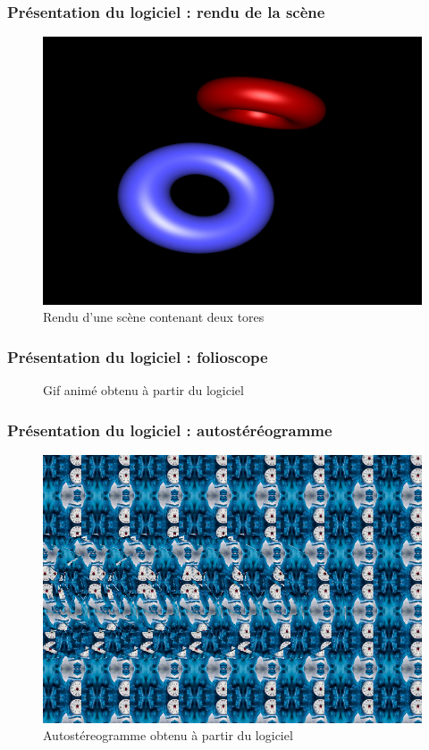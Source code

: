 \documentclass{beamer}
\begin{document}
%
\begin{frame}
\frametitle{Présentation du logiciel : rendu de la scène}
\begin{figure}
\centering
\includegraphics[scale=0.3]{logiciel1.png}
\caption{Rendu d'une scène contenant deux tores}
\end{figure}

\end{frame}

%
\begin{frame}
\frametitle{Présentation du logiciel : folioscope}
\begin{figure}
\centering
{}
\caption{Gif animé obtenu à partir du logiciel}
\end{figure}
\end{frame}



%
\begin{frame}
\frametitle{Présentation du logiciel : autostéréogramme}
\begin{figure}
\centering
\includegraphics[scale=0.4]{donut1.png}
\caption{Autostéreogramme obtenu à partir du logiciel}
\end{figure}
\end{frame}
\end{document}
